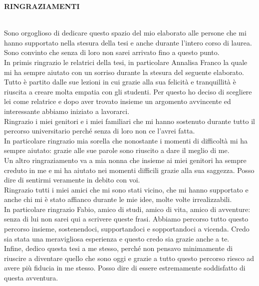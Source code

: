 \documentclass[a4paper,final,12pt]{report}
\newcommand\tab[1][13mm]{\hspace*{#1}}
\begin{document}
\setlength{\parindent}{0pt}
\begin{LARGE}
\textbf{RINGRAZIAMENTI\\\\}
\end{LARGE}
\tab[10pt] Sono orgoglioso di dedicare questo spazio del mio elaborato alle persone che mi hanno supportato nella stesura della tesi e anche durante l'intero corso di laurea. Sono convinto che senza di loro non sarei arrivato fino a questo punto.\\
\tab[10pt] In primis ringrazio le relatrici della tesi, in particolare Annalisa Franco la quale mi ha sempre aiutato con un sorriso durante la stesura del seguente elaborato.
Tutto è partito dalle sue lezioni in cui grazie alla sua felicità e tranquillità è riuscita a creare molta empatia con gli studenti. Per questo ho deciso di scegliere lei come relatrice e dopo aver trovato insieme un argomento avvincente ed interessante abbiamo iniziato a lavorarci.\\
\tab[10pt] Ringrazio i miei genitori e i miei familiari che mi hanno sostenuto durante tutto il percorso universitario perché senza di loro non ce l'avrei fatta. \\
\tab[10pt]In particolare ringrazio mia sorella che nonostante i momenti di difficoltà mi ha sempre aiutato: grazie alle sue parole sono riuscito a dare il meglio di me.\\
\tab[10pt] Un altro ringraziamento va a mia nonna che insieme ai miei genitori ha sempre creduto in me e mi ha aiutato nei momenti difficili grazie alla sua saggezza. Posso dire di sentirmi veramente in debito con voi.\\
\tab[10pt] Ringrazio tutti i miei amici che mi sono stati vicino, che mi hanno supportato e anche chi mi è stato affianco durante le mie idee, molte volte irrealizzabili.\\
\tab[10pt] In particolare ringrazio Fabio, amico di studi, amico di vita, amico di avventure: senza di lui non sarei qui a scrivere queste frasi. Abbiamo percorso tutto questo percorso insieme, sostenendoci, supportandoci e sopportandoci a vicenda. Credo sia stata una meravigliosa esperienza e questo credo sia grazie anche a te. \\

\tab[10pt]Infine, dedico questa tesi a me stesso, perché non pensavo minimamente di riuscire a diventare quello che sono oggi e grazie a tutto questo percorso riesco ad avere più fiducia in me stesso. Posso dire di essere estremamente soddisfatto di questa avventura.
\end{document}
